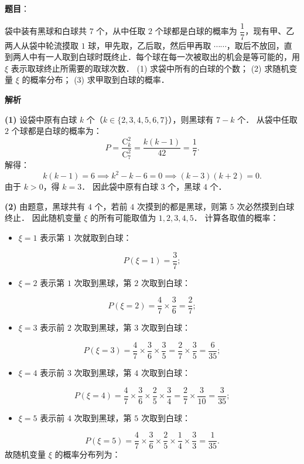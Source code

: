 \begin{answer}

\end{answer}
\begin{answer}

\textbf{题目}：

袋中装有黑球和白球共 $7$ 个，从中任取 $2$ 个球都是白球的概率为 $\dfrac{1}{7}$，现有甲、乙两人从袋中轮流摸取 $1$ 球，甲先取，乙后取，然后甲再取 $\cdots\cdots$，取后不放回，直到两人中有一人取到白球时既终止．每个球在每一次被取出的机会是等可能的，用 $\xi$ 表示取球终止所需要的取球次数．
(1) 求袋中所有的白球的个数；
(2) 求随机变量 $\xi$ 的概率分布；
(3) 求甲取到白球的概率．

\textbf{解析}

\textbf{(1)}
设袋中原有白球 $k$ 个（$k \in \{2, 3, 4, 5, 6, 7\}$），则黑球有 $7 - k$ 个．
从袋中任取 $2$ 个球都是白球的概率为：
\nopagebreak[4]
\[
P = \dfrac{\mathrm{C}_k^2}{\mathrm{C}_7^2} = \dfrac{k(k-1)}{42} = \dfrac{1}{7}.
\]
解得：
\nopagebreak[4]
\[
k(k-1) = 6 \implies k^2 - k - 6 = 0 \implies (k - 3)(k + 2) = 0.
\]
由于 $k > 0$，得 $k = 3$．
因此袋中原有白球 $3$ 个，黑球 $4$ 个．

\textbf{(2)}
由题意，黑球共有 $4$ 个，若前 $4$ 次摸到的都是黑球，则第 $5$ 次必然摸到白球终止．
因此随机变量 $\xi$ 的所有可能取值为 $1, 2, 3, 4, 5$．
计算各取值的概率：
\begin{itemize}
\item $\xi = 1$ 表示第 $1$ 次就取到白球：
\end{itemize}
\nopagebreak[4]
\[
P(\xi = 1) = \dfrac{3}{7};
\]
\begin{itemize}
\item $\xi = 2$ 表示第 $1$ 次取到黑球，第 $2$ 次取到白球：
\end{itemize}
\nopagebreak[4]
\[
P(\xi = 2) = \dfrac{4}{7} \times \dfrac{3}{6} = \dfrac{2}{7};
\]
\begin{itemize}
\item $\xi = 3$ 表示前 $2$ 次取到黑球，第 $3$ 次取到白球：
\end{itemize}
\nopagebreak[4]
\[
P(\xi = 3) = \dfrac{4}{7} \times \dfrac{3}{6} \times \dfrac{3}{5} = \dfrac{2}{7} \times \dfrac{3}{5} = \dfrac{6}{35};
\]
\begin{itemize}
\item $\xi = 4$ 表示前 $3$ 次取到黑球，第 $4$ 次取到白球：
\end{itemize}
\nopagebreak[4]
\[
P(\xi = 4) = \dfrac{4}{7} \times \dfrac{3}{6} \times \dfrac{2}{5} \times \dfrac{3}{4} = \dfrac{2}{7} \times \dfrac{3}{10} = \dfrac{3}{35};
\]
\begin{itemize}
\item $\xi = 5$ 表示前 $4$ 次取到黑球，第 $5$ 次取到白球：
\end{itemize}
\nopagebreak[4]
\[
P(\xi = 5) = \dfrac{4}{7} \times \dfrac{3}{6} \times \dfrac{2}{5} \times \dfrac{1}{4} \times \dfrac{3}{3} = \dfrac{1}{35}.
\]
故随机变量 $\xi$ 的概率分布列为：


\end{answer}
